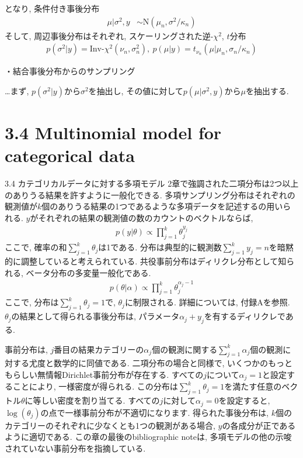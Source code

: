 \documentclass[10pt,dvipdfmx,a4]{beamer}
\newcommand{\eqn}[1]{\begin{align*}#1\end{align*}}
\begin{document}
\begin{frame}[t]
となり, 条件付き事後分布
\eqn{\mu|\sigma^2,y&\sim\text{N}(\mu_n,\sigma^2/\kappa_n)}
そして, 周辺事後分布はそれぞれ, スケーリングされた逆-$\chi^2$, $t$分布
\eqn{p(\sigma^2|y)=\text{Inv-}\chi^2(\nu_n,\sigma_n^2),\ p(\mu|y)=t_{\nu_n}(\mu|\mu_n,\sigma_n/\kappa_n)}

・結合事後分布からのサンプリング

…まず, $p(\sigma^2|y)$から$\sigma^2$を抽出し, その値に対して$p(\mu|\sigma^2,y)$から$\mu$を抽出する.
\end{frame}

\section{3.4 Multinomial model for categorical data}
\begin{frame}{3.4 カテゴリカルデータに対する多項モデル}
2章で強調された二項分布は2つ以上のありうる結果を許すように一般化できる.
多項サンプリング分布はそれぞれの観測値が$k$個のありうる結果の1つであるような多項データを記述するの用いられる.
$y$がそれぞれの結果の観測値の数のカウントのベクトルならば,
\eqn{p(y|\theta)\propto\prod_{j=1}^k \theta_j^{y_j}}
ここで, 確率の和$\sum_{j=1}^k\theta_j$は1である.
分布は典型的に観測数$\sum_{j=1}^k y_j=n$を暗黙的に調整していると考えられている.
共役事前分布はディリクレ分布として知られる, ベータ分布の多変量一般化である.
\eqn{p(\theta|\alpha)\propto \prod_{j=1}^k\theta_j^{\alpha_j-1}}
ここで, 分布は$\sum_{j=1}^k \theta_j=1$で, $\theta_j$に制限される.
詳細については, 付録Aを参照.
$\theta_j$の結果として得られる事後分布は, パラメータ$\alpha_j+y_j$を有するディリクレである.
\end{frame}


\begin{frame}
事前分布は, $j$番目の結果カテゴリーの$\alpha_j$個の観測に関する$\sum_{j=1}^k \alpha_j$個の観測に対する尤度と数学的に同値である.
二項分布の場合と同様で, いくつかのもっともらしい無情報Dirichlet事前分布が存在する.
すべての$j$について$\alpha_j= 1$と設定することにより, 一様密度が得られる.
この分布は$\sum^k_{j=1}\theta_j=1$を満たす任意のベクトル$\theta$に等しい密度を割り当てる.
すべての$j$に対して$\alpha_j= 0$を設定すると, $\log(\theta_j)$の点で一様事前分布が不適切になります.
得られた事後分布は, $k$個のカテゴリーのそれぞれに少なくとも1つの観測がある場合, $y$の各成分が正であるように適切である.
この章の最後のbibliographic noteは, 多項モデルの他の示唆されていない事前分布を指摘している.
\end{frame}
\end{document}
